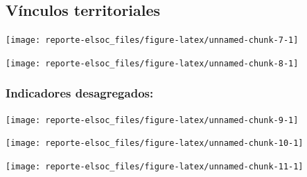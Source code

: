 \documentclass[
  12pt,
]{book}
\begin{document}
\hypertarget{vuxednculos-territoriales-1}{%
\subsection{Vínculos territoriales}\label{vuxednculos-territoriales-1}}

\begin{center}\texttt{[image: reporte-elsoc\_files/figure-latex/unnamed-chunk-7-1]} \end{center}

\begin{center}\texttt{[image: reporte-elsoc\_files/figure-latex/unnamed-chunk-8-1]} \end{center}

\hypertarget{indicadores-desagregados}{%
\subsubsection{Indicadores desagregados:}\label{indicadores-desagregados}}

\begin{center}\texttt{[image: reporte-elsoc\_files/figure-latex/unnamed-chunk-9-1]} \end{center}

\begin{center}\texttt{[image: reporte-elsoc\_files/figure-latex/unnamed-chunk-10-1]} \end{center}

\begin{center}\texttt{[image: reporte-elsoc\_files/figure-latex/unnamed-chunk-11-1]} \end{center}
\end{document}
